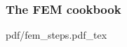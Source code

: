 \begin{frame}
  \frametitle{The FEM cookbook}

  \def\svgwidth{1.05\textwidth}
  {pdf/fem_steps.pdf_tex}

\end{frame}
